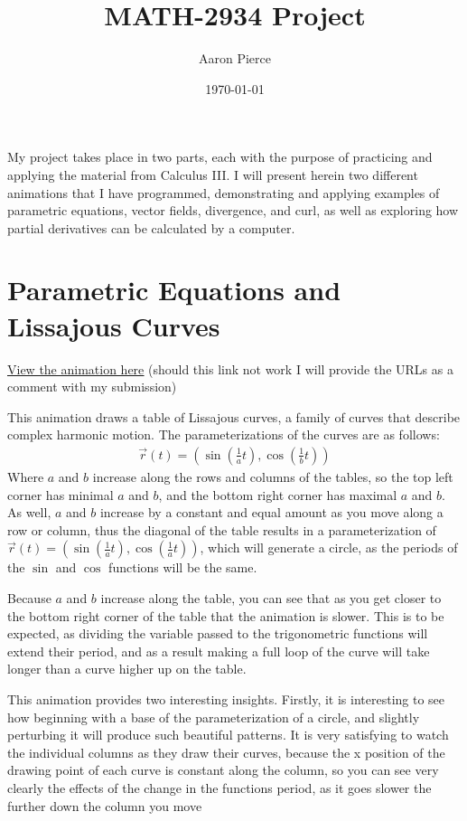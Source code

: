 \documentclass{article}
\title{MATH-2934 Project}
\author{Aaron Pierce}
\date{\today}
\begin{document}
    \maketitle

    My project takes place in two parts, each with the purpose of practicing and applying the material from Calculus III.
    I will present herein two different animations that I have programmed, demonstrating and applying examples of parametric equations, vector fields, divergence, and curl,
    as well as exploring how partial derivatives can be calculated by a computer.

    \section{Parametric Equations and Lissajous Curves}
    \underline{\href{https://saxten2011.github.io/AlmostLissajousCurves/}{View the animation here}} (should this link not work I will provide the URLs as a comment with my submission)

    This animation draws a table of Lissajous curves, a family of curves that describe complex harmonic motion.
    The parameterizations of the curves are as follows:
    \begin{gather*}
        \vec{r}(t) = \left( \sin(\frac{1}{a} t), \cos(\frac{1}{b} t) \right)
    \end{gather*}
    Where $a$ and $b$ increase along the rows and columns of the tables, so the top left corner has minimal $a$ and $b$, and the bottom right corner has maximal $a$ and $b$.
    As well, $a$ and $b$ increase by a constant and equal amount as you move along a row or column, thus the diagonal of the table results in a parameterization of 
    $\vec{r}(t) = \left( \sin(\frac{1}{a} t), \cos(\frac{1}{a} t) \right)$, which will generate a circle, as the periods of the $\sin$ and $\cos$ functions will be the same.

    Because $a$ and $b$ increase along the table, you can see that as you get closer to the bottom right corner of the table that the animation is slower.
    This is to be expected, as dividing the variable passed to the trigonometric functions will extend their period, and as a result making a full loop of the curve will take longer than a curve higher up on the table.

    This animation provides two interesting insights.
    Firstly, it is interesting to see how beginning with a base of the parameterization of a circle, and slightly perturbing it will produce such beautiful patterns.
    It is very satisfying to watch the individual columns as they draw their curves, because the x position of the drawing point of each curve is constant along the column, so you can see very clearly the effects of the change in the functions period, as it goes slower the further down the column you move
\end{document}
